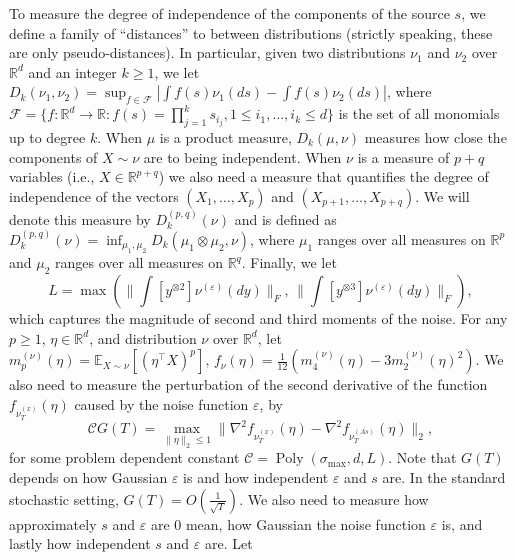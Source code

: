 \documentclass{article} %
\newcommand{\real}{\mathbb{R}}
\DeclareMathOperator{\pol}{Poly}
\newcommand{\poly}[1]{\pol\left(#1\right)}
\newcommand{\E}{\mathbb{E}}
\renewcommand{\epsilon}{\varepsilon}
\theoremstyle{definition}
\begin{document}
To measure the degree of independence of the components of the source $s$, we define
a family of ``distances'' to between distributions (strictly speaking, these are only pseudo-distances).
In particular, given two distributions $\nu_1$ and $\nu_2$ over $\real^d$ and an integer $k\ge 1$, we
let $D_k(\nu_1,\nu_2) = \sup_{f\in\mathcal{F}} |\int f(s)\nu_1(ds) - \int f(s)\nu_2(ds)|$, 
where $\mathcal{F}=\{f:\real^d \to \real : f(s)=\prod_{j=1}^k s_{i_j}, 1 \le i_1,\ldots,i_k \le d\}$ 
is the set of all monomials up to degree $k$.
When $\mu$ is a product measure, $D_k(\mu,\nu)$ measures how close the components of $X\sim \nu$ are to being independent.
When $\nu$ is a measure of $p+q$ variables (i.e., $X\in \real^{p+q}$) 
we also need a measure that quantifies the degree of independence of the vectors $(X_1,\dots,X_p)$ and $(X_{p+1},\dots,X_{p+q})$. We will denote this measure by $D_k^{(p,q)}(\nu)$ and is defined as $D_k^{(p,q)} (\nu)= \inf_{\mu_1,\mu_2} D_k(\mu_1\otimes \mu_2,\nu)$, where $\mu_1$ ranges over all measures on $\real^p$ and $\mu_2$ ranges over all measures on $\real^q$. 
Finally, we let 
\[
L = \max \left( \| \textstyle\int  [y^{\otimes 2}] \nu^{(\epsilon)}(dy) \|_F,\, 
			  \| \int  [y^{\otimes 3}] \nu^{(\epsilon)}(dy) \|_F \right),
\]
which captures the magnitude of second and third moments of the noise.
For any $p\ge 1$, $\eta\in \real^d$, and distribution $\nu$ over $\real^d$,
let 
$m_p^{(\nu)}(\eta) = \E_{X\sim \nu}[ (\eta^\top X)^p ],\, f_{\nu}(\eta) = \tfrac1{12} \left( m_4^{(\nu)}(\eta) - 3 m_2^{(\nu)}(\eta)^2 \right)$.
We also need to measure the perturbation of the second derivative of the function $f_{\nu_T^{(x)}}(\eta)$ caused by the noise function $\epsilon$, by 
\[
\mathcal{C}G(T) = \max_{\|\eta\|_2\le 1}\| \nabla^2f_{\nu_T^{(x)}}(\eta) - \nabla^2f_{\nu_T^{(As)}}(\eta) \|_2, 
\] 
for some problem dependent constant $\mathcal{C} = \poly{\sigma_{\max}, d, L}$. Note that $G(T)$ depends on how Gaussian $\epsilon$ is and how independent $\epsilon$ and $s$ are. 
In the standard stochastic setting, $G(T) = O(\frac{1}{\sqrt{T}})$.
\fi
%
We also need to measure how approximately $s$ and $\epsilon$ are 0 mean, how Gaussian the noise function $\epsilon$ is, and lastly how independent $s$ and $\epsilon$ are. Let 
\end{document}
